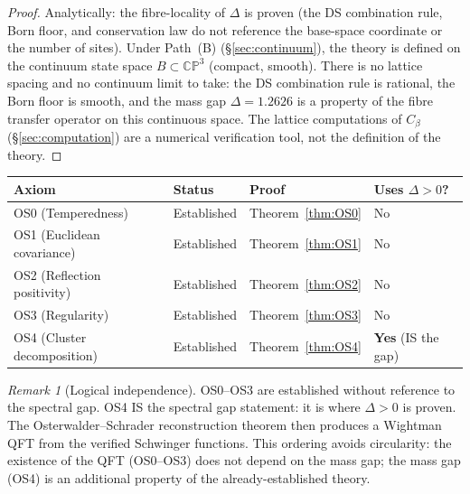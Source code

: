 \documentclass[11pt,a4paper]{article}
\theoremstyle{definition}
\theoremstyle{remark}
\newtheorem{remark}[theorem]{Remark}
\newcommand{\CP}{\mathbb{CP}}
\begin{document}
\begin{proof}
Analytically: the fibre-locality of $\Delta$ is proven (the DS combination rule, Born floor, and conservation law do not reference the base-space coordinate or the number of sites). Under Path~(B) (\S\ref{sec:continuum}), the theory is defined on the continuum state space $B\subset\CP^3$ (compact, smooth). There is no lattice spacing and no continuum limit to take: the DS combination rule is rational, the Born floor is smooth, and the mass gap $\Delta=1.2626$ is a property of the fibre transfer operator on this continuous space. The lattice computations of $C_\beta$ (\S\ref{sec:computation}) are a numerical verification tool, not the definition of the theory.
\end{proof}

\begin{center}
\begin{tabular}{llll}
\toprule
Axiom & Status & Proof & Uses $\Delta>0$? \\
\midrule
OS0 (Temperedness) & Established & Theorem~\ref{thm:OS0} & No \\
OS1 (Euclidean covariance) & Established & Theorem~\ref{thm:OS1} & No \\
OS2 (Reflection positivity) & Established & Theorem~\ref{thm:OS2} & No \\
OS3 (Regularity) & Established & Theorem~\ref{thm:OS3} & No \\
OS4 (Cluster decomposition) & Established & Theorem~\ref{thm:OS4} & \textbf{Yes} (IS the gap) \\
\bottomrule
\end{tabular}
\end{center}

\begin{remark}[Logical independence]
OS0--OS3 are established without reference to the spectral gap. OS4 IS the spectral gap statement: it is where $\Delta>0$ is proven. The Osterwalder--Schrader reconstruction theorem then produces a Wightman QFT from the verified Schwinger functions. This ordering avoids circularity: the existence of the QFT (OS0--OS3) does not depend on the mass gap; the mass gap (OS4) is an additional property of the already-established theory.
\end{remark}
\end{document}
